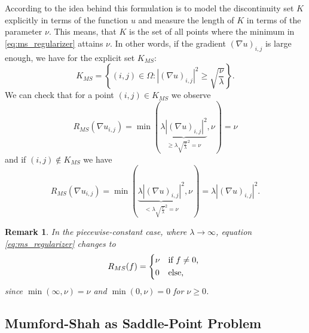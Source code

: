 \documentclass{scrreprt}
\newtheorem{remark}[theorem]{Remark}
\begin{document}
        According to \cite{Strekalovskiy-Cremers-eccv14} the idea behind this formulation is to model the discontinuity set $K$ explicitly in terms of the function $u$ and measure the length of $K$ in terms of the parameter $\nu$. This means, that $K$ is the set of all points where the minimum in \ref{eq:ms_regularizer} attains $\nu$. In other words, if the gradient $(\nabla u)_{i,j}$ is large enough, we have for the explicit set $K_{MS}$:
            \begin{equation}
                K_{MS} = \left\{ (i, j) \in \Omega : |(\nabla u)_{i, j}|^{2} \ge \sqrt{\frac{\nu}{\lambda}} \right\}.
                \label{eq:edge_set_k}
            \end{equation}
        We can check that for a point $(i, j) \in K_{MS}$ we observe
            $$
                R_{MS}(\nabla u_{i, j}) = \min(\underbrace{\lambda|(\nabla u)_{i, j}|^{2}}_{\ge \lambda \sqrt{\frac{\nu}{\lambda}}^{2} = \nu}, \nu) = \nu
            $$
        and if $(i, j) \notin K_{MS}$ we have
            $$
                R_{MS}(\nabla u_{i, j}) = \min(\underbrace{\lambda|(\nabla u)_{i, j}|^{2}}_{< \lambda \sqrt{\frac{\nu}{\lambda}}^{2} = \nu}, \nu) = \lambda|(\nabla u)_{i, j}|^{2}.
            $$

        \begin{remark}
            In the piecewise-constant case, where $\lambda \to \infty$, equation \ref{eq:ms_regularizer} changes to
                $$
                    R_{MS}(f) = 
                        \begin{dcases*}
                            \nu & \textnormal{if $f \ne 0$,} \\
                            0 & \textnormal{else,}
                        \end{dcases*}
                $$
            since $\min(\infty, \nu) = \nu$ and $\min(0, \nu) = 0$ for $\nu \ge 0$.
        \end{remark}

        \subsection{Mumford-Shah as Saddle-Point Problem} %
        \label{sub:mumford_shah_as_saddle_point_problem}
\end{document}
